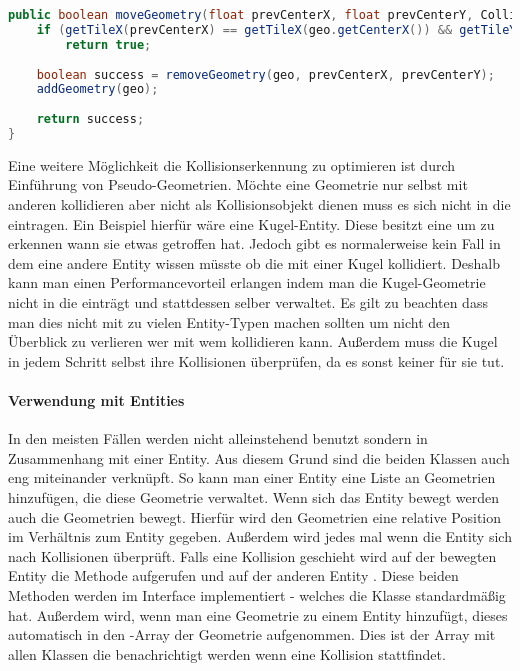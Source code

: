 \doinline
\begin{lstlisting}[caption=Bewegen einer Geometrie in der CollisionMap, title=\hspace{0 pt}, language=java]
public boolean moveGeometry(float prevCenterX, float prevCenterY, CollisionGeometry geo) {
	if (getTileX(prevCenterX) == getTileX(geo.getCenterX()) && getTileY(prevCenterY) == getTileY(geo.getCenterY()))
		return true;
	
	boolean success = removeGeometry(geo, prevCenterX, prevCenterY);
	addGeometry(geo);
	
	return success;
}
\end{lstlisting}

Eine weitere Möglichkeit die Kollisionserkennung zu optimieren ist durch Einführung von Pseudo-Geometrien. Möchte eine Geometrie nur selbst mit anderen kollidieren aber nicht als Kollisionsobjekt dienen muss es sich nicht in die  eintragen. Ein Beispiel hierfür wäre eine Kugel-Entity.
Diese besitzt eine  um zu erkennen wann sie etwas getroffen hat. Jedoch gibt es normalerweise kein Fall in dem eine andere Entity wissen müsste ob die mit einer Kugel kollidiert.
Deshalb kann man einen Performancevorteil erlangen indem man die Kugel-Geometrie nicht in die  einträgt und stattdessen selber verwaltet. Es gilt zu beachten dass man dies nicht mit zu vielen Entity-Typen machen sollten um nicht den Überblick zu verlieren wer mit wem kollidieren kann.
Außerdem muss die Kugel in jedem Schritt selbst ihre Kollisionen überprüfen, da es sonst keiner für sie tut.

\paragraph{Verwendung mit Entities}

In den meisten Fällen werden  nicht alleinstehend benutzt sondern in Zusammenhang mit einer Entity. Aus diesem Grund sind die beiden Klassen auch eng miteinander verknüpft. So kann man einer Entity eine Liste an Geometrien hinzufügen, die diese Geometrie verwaltet. Wenn sich das Entity bewegt werden auch die Geometrien bewegt. Hierfür wird den Geometrien eine relative Position im Verhältnis zum Entity gegeben.
Außerdem wird jedes mal wenn die Entity sich  nach Kollisionen überprüft. Falls eine Kollision geschieht wird auf der bewegten Entity die Methode  aufgerufen und auf der anderen Entity . Diese beiden Methoden werden im Interface  implementiert - welches die Klasse  standardmäßig hat. Außerdem wird, wenn man eine Geometrie zu einem Entity hinzufügt, dieses automatisch in den -Array der Geometrie aufgenommen. Dies ist der Array mit allen Klassen die benachrichtigt werden wenn eine Kollision stattfindet.

